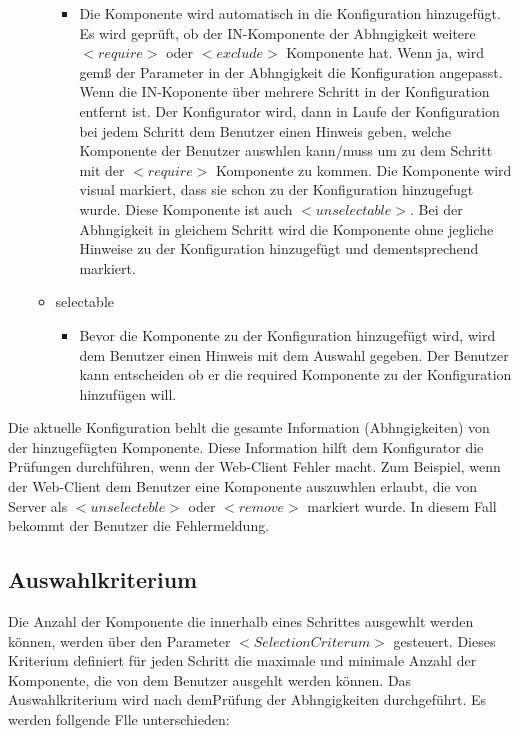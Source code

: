 \documentclass{article}
\begin{document}
\begin{itemize}
\begin{itemize}
\begin{itemize}
          \item Die Komponente wird automatisch in die Konfiguration hinzugef\"ugt.
          Es wird gepr\"uft, ob der IN-Komponente der Abhngigkeit weitere
          $<require>$ oder $<exclude>$ Komponente hat. Wenn ja, wird gem\ss{} der
          Parameter in der Abhngigkeit die Konfiguration angepasst. Wenn die
          IN-Koponente über mehrere Schritt in der Konfiguration entfernt ist. Der
          Konfigurator wird, dann in Laufe der Konfiguration bei jedem Schritt dem
          Benutzer einen Hinweis geben, welche Komponente der Benutzer auswhlen
          kann/muss um zu dem Schritt mit der $<require>$ Komponente zu kommen. Die
          Komponente wird visual markiert, dass sie schon zu der Konfiguration
          hinzugefugt wurde. Diese Komponente ist auch $<unselectable>$. Bei der
          Abhngigkeit in gleichem Schritt wird die Komponente ohne jegliche
          Hinweise zu der Konfiguration hinzugef\"ugt und dementsprechend markiert.
        \end{itemize}

        \item selectable

        \begin{itemize}
            \item Bevor die Komponente zu der Konfiguration hinzugef\"ugt wird, wird
            dem Benutzer einen Hinweis mit dem Auswahl gegeben. Der Benutzer kann
            entscheiden ob er die required Komponente zu der Konfiguration
            hinzuf\"ugen will.
        \end{itemize}
    \end{itemize}
\end{itemize}

Die aktuelle Konfiguration behlt die gesamte Information (Abhngigkeiten)
von der hinzugef\"ugten Komponente. Diese Information hilft dem Konfigurator die
Pr\"ufungen durchf\"uhren, wenn der Web-Client Fehler macht. Zum Beispiel, wenn
der Web-Client dem Benutzer eine Komponente auszuwhlen erlaubt, die von
Server als $<unselecteble>$ oder $<remove>$ markiert wurde. In diesem Fall
bekommt der Benutzer die Fehlermeldung.

\subsection{Auswahlkriterium}

Die Anzahl der Komponente die innerhalb eines Schrittes ausgewhlt werden
können, werden über den Parameter $<SelectionCriterum>$ gesteuert. Dieses
Kriterium definiert für jeden Schritt die maximale und minimale Anzahl der
Komponente, die von dem Benutzer ausgehlt werden k\"onnen. Das Auswahlkriterium
wird nach demPr\"ufung der Abhngigkeiten durchgeführt. Es werden follgende Flle
unterschieden:
\end{document}

